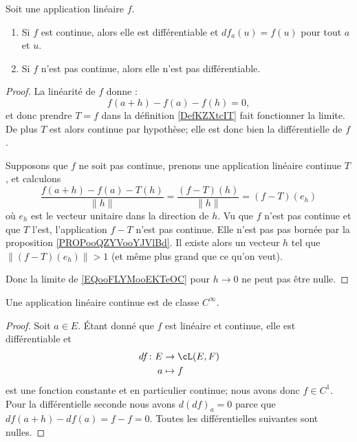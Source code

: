\begin{lemma}       \label{LemooXXUGooUqCjmp}
    Soit une application linéaire \( f\). 
    \begin{enumerate}
        \item
            Si \( f\) est continue, alors elle est différentiable et \( df_a(u)=f(u)\) pour tout \( a\) et \( u\).
        \item 
            Si \( f\) n'est pas continue, alors elle n'est pas différentiable.
    \end{enumerate}
\end{lemma}

\begin{proof}
    La linéarité de \( f\) donne :
    \begin{equation}
        f(a+h)-f(a)-f(h)=0,
    \end{equation}
    et donc prendre \( T=f\) dans la définition \ref{DefKZXtcIT} fait fonctionner la limite. De plus \( T\) est alors continue par hypothèse; elle est donc bien la différentielle de \( f\).

    Supposons que \( f\) ne soit pas continue, prenons une application linéaire continue \( T\), et calculons
    \begin{equation}        \label{EQooFLYMooEKTeOC}
        \frac{ f(a+h)-f(a)-T(h) }{ \| h \| }=\frac{ (f-T)(h) }{ \| h \| }=(f-T)(e_h)
    \end{equation}
    où \( e_h\) est le vecteur unitaire dans la direction de \( h\). Vu que \( f\) n'est pas continue et que \( T\) l'est, l'application \( f-T\) n'est pas continue. Elle n'est pas pas bornée par la proposition \ref{PROPooQZYVooYJVlBd}. Il existe alors un vecteur \( h\) tel que \( \| (f-T)(e_h) \|>1\) (et même plus grand que ce qu'on veut).

    Donc la limite de \eqref{EQooFLYMooEKTeOC} pour \( h\to 0\) ne peut pas être nulle.
\end{proof}

\begin{lemma}   \label{LemLLvgPQW}
    Une application linéaire continue est de classe \(  C^{\infty}\).
\end{lemma}

\begin{proof}
    Soit \( a\in E\). Étant donné que \( f\) est linéaire et continue, elle est différentiable et
    \begin{equation}
        \begin{aligned}
            df\colon E&\to \cL(E,F) \\
            a&\mapsto f 
        \end{aligned}
    \end{equation}
    est une fonction constante et en particulier continue; nous avons donc \( f\in C^1\). Pour la différentielle seconde nous avons \( d(df)_a=0\) parce que \( df(a+h)-df(a)=f-f=0\). Toutes les différentielles suivantes sont nulles.
\end{proof}

